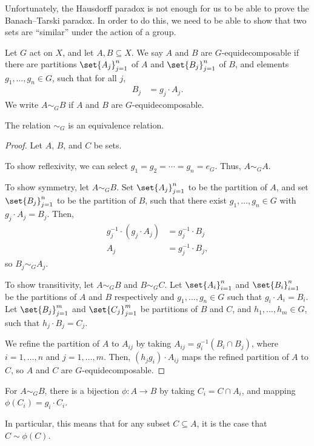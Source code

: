Unfortunately, the Hausdorff paradox is not enough for us to be able to prove the Banach--Tarski paradox. In order to do this, we need to be able to show that two sets are ``similar'' under the action of a group.
\begin{definition}
  Let $G$ act on $X$, and let $A,B\subseteq X$. We say $A$ and $B$ are $G$-equidecomposable if there are partitions $\set{A_j}_{j=1}^{n}$ of $A$ and $\set{B_j}_{j=1}^{n}$ of $B$, and elements $g_1,\dots,g_n\in G$, such that for all $j$,
  \begin{align*}
    B_j &= g_j\cdot A_j.
  \end{align*}
  We write $A\sim_{G}B$ if $A$ and $B$ are $G$-equidecomposable.
\end{definition}
\begin{fact}
  The relation $\sim_{G}$ is an equivalence relation.
\end{fact}
\begin{proof}
  Let $A$, $B$, and $C$ be sets.\newline

  To show reflexivity, we can select $g_1 = g_2 = \cdots = g_n = e_G$. Thus, $A\sim_{G}A$.\newline

  To show symmetry, let $A\sim_{G} B$. Set $\set{A_j}_{j=1}^{n}$ to be the partition of $A$, and set $\set{B_j}_{j=1}^{n}$ to be the partition of $B$, such that there exist $g_1,\dots,g_n\in G$ with $g_j\cdot A_j = B_j$. Then,
  \begin{align*}
    g_j^{-1}\cdot \left(g_j\cdot A_j\right) &= g_j^{-1}\cdot B_j\\
    A_j &= g_j^{-1}\cdot B_j,
  \end{align*}
  so $B_j\sim_{G}A_j$.\newline

  To show transitivity, let $A\sim_{G} B$ and $B\sim_{G} C$. Let $\set{A_i}_{i=1}^{n}$ and $\set{B_i}_{i=1}^{n}$ be the partitions of $A$ and $B$ respectively and $g_1,\dots,g_n\in G$ such that $g_i\cdot A_i = B_i$. Let $\set{B_j}_{j=1}^{m}$ and $\set{C_j}_{j=1}^{m}$ be partitions of $B$ and $C$, and $h_1,\dots,h_m\in G$, such that $h_j\cdot B_j = C_j$.\newline

  We refine the partition of $A$ to $A_{ij}$ by taking $A_{ij} = g_i^{-1}\left(B_{i}\cap B_j\right)$, where $i = 1,\dots,n$ and $j = 1,\dots,m$. Then, $\left(h_jg_i\right)\cdot A_{ij}$ maps the refined partition of $A$ to $C$, so $A$ and $C$ are $G$-equidecomposable.
\end{proof}
\begin{fact}
  For $A\sim_{G} B$, there is a bijection $\phi\colon A\rightarrow B$ by taking $C_{i} = C\cap A_i$, and mapping $\phi\left(C_i\right) = g_i\cdot C_i$.\newline

  In particular, this means that for any subset $C\subseteq A$, it is the case that $C\sim \phi(C)$.\label{fact:bijections}
\end{fact}

